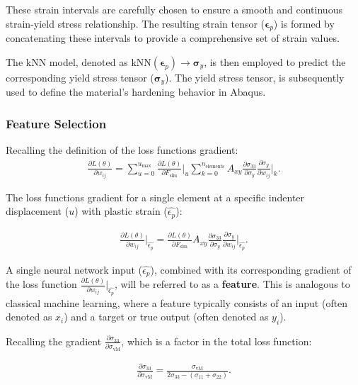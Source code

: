 These strain intervals are carefully chosen to ensure a smooth and continuous strain-yield stress relationship. The resulting strain tensor (\(\boldsymbol{\epsilon}_p\)) is formed by concatenating these intervals to provide a comprehensive set of strain values.

The kNN model, denoted as \( \text{kNN}(\boldsymbol{\epsilon}_p) \rightarrow \boldsymbol{\sigma}_y \), is then employed to predict the corresponding yield stress tensor (\(\boldsymbol{\sigma}_y\)). The yield stress tensor, is subsequently used to define the material's hardening behavior in Abaqus.

\subsubsection{Feature Selection}
Recalling the definition of the loss functions gradient:
\begin{align*}
    \frac{\partial L(\theta)}{\partial w_{ij}}=
    \sum_{u=0}^{u_{\text{max}}}
    \frac{\partial L(\theta)}{\partial F_{\text{sim}}}\Big|_u
    \sum_{k=0}^{n_{\text{elements}}}
    A_{xy}
    \frac{\partial \sigma_{33}}{\partial \sigma_y}
    \frac{\partial \sigma_y}{\partial w_{ij}}\Big|_k
    .
\end{align*}

The loss functions gradient for a single element at a specific indenter displacement ($u$) with plastic strain ($\hat{\epsilon_p}$):

\begin{align*}
    \frac{\partial L(\theta)}{\partial w_{ij}}\Big|_{\hat{\epsilon_p}} =
    \frac{\partial L(\theta)}{\partial F_{\text{sim}}}
    A_{xy}
    \frac{\partial \sigma_{33}}{\partial \sigma_y}
    \frac{\partial \sigma_y}{\partial w_{ij}}\Big|_{\hat{\epsilon_p}}
    .
\end{align*}

A single neural network input (\({\hat{\epsilon_p}}\)), combined with its corresponding gradient of the loss function \(\frac{\partial L(\theta)}{\partial w_{ij}}\Big|_{\hat{\epsilon_p}}\), will be referred to as a \textbf{feature}. This is analogous to classical machine learning, where a feature typically consists of an input (often denoted as \(x_i\)) and a target or true output (often denoted as \(y_i\)).


Recalling the gradient $\frac{\partial \sigma_{33}}{\partial \sigma_{\text{vM}}}$, which is a factor in the total loss function:

\begin{align*}
    \frac{\partial \sigma_{33}}{\partial \sigma_{\text{vM}}}=
    \frac{\sigma_{\text{vM}}}{2\sigma_{33} - (\sigma_{11} + \sigma_{22})}.
\end{align*}

